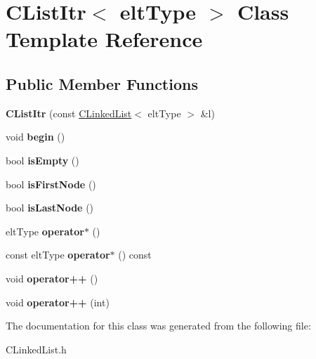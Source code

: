 \hypertarget{classCListItr}{\section{C\-List\-Itr$<$ elt\-Type $>$ Class Template Reference}
\label{classCListItr}
}
\subsection*{Public Member Functions}
\begin{DoxyCompactItemize}
\item 
\hypertarget{classCListItr_a4d8ba7aaff5fc47b863193e286c00a33}{{\bfseries C\-List\-Itr} (const \hyperlink{classCLinkedList}{C\-Linked\-List}$<$ elt\-Type $>$ \&l)}\label{classCListItr_a4d8ba7aaff5fc47b863193e286c00a33}

\item 
\hypertarget{classCListItr_a486df8368931ef901449c8ba7fbacd63}{void {\bfseries begin} ()}\label{classCListItr_a486df8368931ef901449c8ba7fbacd63}

\item 
\hypertarget{classCListItr_a7d1c4e8f7222e9dbf0b1672b243b7e1e}{bool {\bfseries is\-Empty} ()}\label{classCListItr_a7d1c4e8f7222e9dbf0b1672b243b7e1e}

\item 
\hypertarget{classCListItr_a5f202b672e225979e7b68389dd44bdae}{bool {\bfseries is\-First\-Node} ()}\label{classCListItr_a5f202b672e225979e7b68389dd44bdae}

\item 
\hypertarget{classCListItr_a5ba33c2b6decfdbb11af2e3d71788dc0}{bool {\bfseries is\-Last\-Node} ()}\label{classCListItr_a5ba33c2b6decfdbb11af2e3d71788dc0}

\item 
\hypertarget{classCListItr_ae2e28e53eeb9917f1cc52832eb9d11a3}{elt\-Type {\bfseries operator$\ast$} ()}\label{classCListItr_ae2e28e53eeb9917f1cc52832eb9d11a3}

\item 
\hypertarget{classCListItr_a46403a7d7c0afb79f984f148e911acc3}{const elt\-Type {\bfseries operator$\ast$} () const }\label{classCListItr_a46403a7d7c0afb79f984f148e911acc3}

\item 
\hypertarget{classCListItr_ae68888e0b4119ad7b6dd5ac32639597a}{void {\bfseries operator++} ()}\label{classCListItr_ae68888e0b4119ad7b6dd5ac32639597a}

\item 
\hypertarget{classCListItr_a0f3889ee3083712d6f4bb9f13d8da496}{void {\bfseries operator++} (int)}\label{classCListItr_a0f3889ee3083712d6f4bb9f13d8da496}

\end{DoxyCompactItemize}


The documentation for this class was generated from the following file\-:\begin{DoxyCompactItemize}
\item 
C\-Linked\-List.\-h\end{DoxyCompactItemize}
